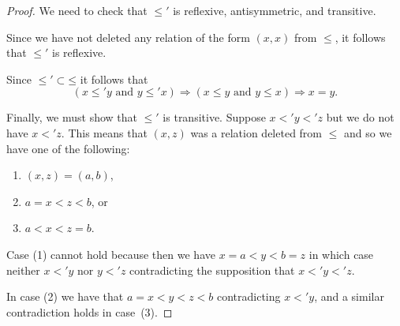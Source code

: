 \documentclass[12pt]{amsart}
\begin{document}
\begin{proof}
  We need to check that $\le'$ is reflexive, antisymmetric, and
  transitive. 

  Since we have not deleted any relation of the form $(x,x)$ from
  $\le$, it follows that $\le'$ is reflexive.

  Since $\mathord{\le'} \subset \mathord{\le}$ it follows that 
  \[
  (x \le' y \text{ and } y \le' x) \Rightarrow
  (x \le y \text{ and } y \le x) \Rightarrow x=y .
  \]

  Finally, we must show that $\le'$ is transitive. Suppose $x <' y <'
  z$ but we do not have $x <' z$. This means that $(x,z)$ was a
  relation deleted from $\le$ and so we have one of the following:
  \begin{enumerate}
  \item $(x,z) = (a,b)$,
  \item $a=x < z < b$, or
  \item $a<x<z=b$.
  \end{enumerate}
  
  Case (1) cannot hold because then we have $x=a<y<b=z$ in which case
  neither $x<'y$ nor $y<'z$ contradicting the supposition that
  $x<'y<'z$. 

  In case (2) we have that $a=x < y < z < b$ contradicting $x <' y$,
  and a similar contradiction holds in case~(3). 
\end{proof}
\end{document}
